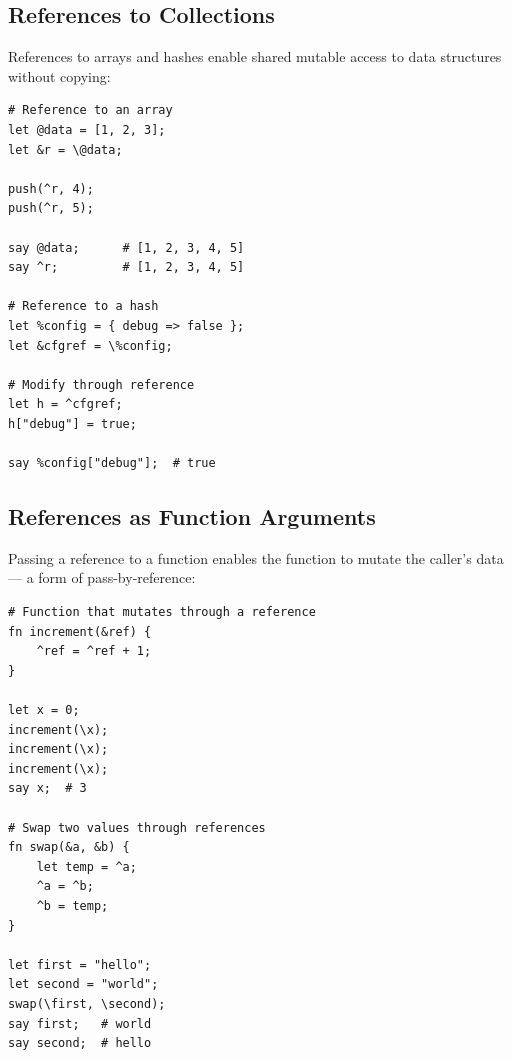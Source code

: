 \subsection{References to Collections}

References to arrays and hashes enable shared mutable access to data structures without copying:

\begin{tcolorbox}[colback=codebg, colframe=darkpurple, colbacktitle=darkpurple, title=\textbf{\textcolor{codegold}{References to Collections}}, fonttitle=\bfseries, sharp corners]
\begin{lstlisting}
# Reference to an array
let @data = [1, 2, 3];
let &r = \@data;

push(^r, 4);
push(^r, 5);

say @data;      # [1, 2, 3, 4, 5]
say ^r;         # [1, 2, 3, 4, 5]

# Reference to a hash
let %config = { debug => false };
let &cfgref = \%config;

# Modify through reference
let h = ^cfgref;
h["debug"] = true;

say %config["debug"];  # true
\end{lstlisting}
\end{tcolorbox}

\subsection{References as Function Arguments}

Passing a reference to a function enables the function to mutate the caller's data — a form of pass-by-reference:

\begin{tcolorbox}[colback=codebg, colframe=darkpurple, colbacktitle=darkpurple, title=\textbf{\textcolor{codegold}{References as Arguments}}, fonttitle=\bfseries, sharp corners]
\begin{lstlisting}
# Function that mutates through a reference
fn increment(&ref) {
    ^ref = ^ref + 1;
}

let x = 0;
increment(\x);
increment(\x);
increment(\x);
say x;  # 3

# Swap two values through references
fn swap(&a, &b) {
    let temp = ^a;
    ^a = ^b;
    ^b = temp;
}

let first = "hello";
let second = "world";
swap(\first, \second);
say first;   # world
say second;  # hello
\end{lstlisting}
\end{tcolorbox}

